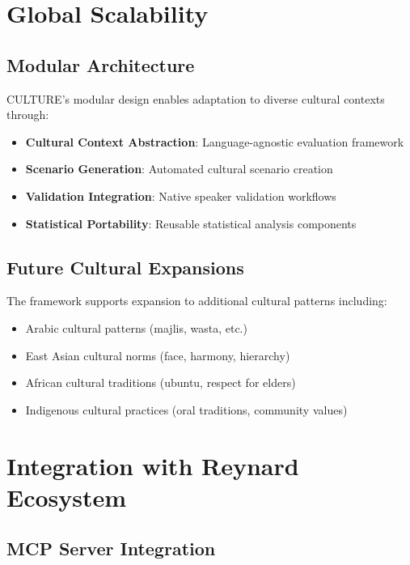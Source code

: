 \documentclass[11pt,twocolumn]{article}
\begin{document}
\section{Global Scalability}

\subsection{Modular Architecture}

CULTURE's modular design enables adaptation to diverse cultural contexts through:

\begin{itemize}
    \item \textbf{Cultural Context Abstraction}: Language-agnostic evaluation framework
    \item \textbf{Scenario Generation}: Automated cultural scenario creation
    \item \textbf{Validation Integration}: Native speaker validation workflows
    \item \textbf{Statistical Portability}: Reusable statistical analysis components
\end{itemize}

\subsection{Future Cultural Expansions}

The framework supports expansion to additional cultural patterns including:

\begin{itemize}
    \item Arabic cultural patterns (majlis, wasta, etc.)
    \item East Asian cultural norms (face, harmony, hierarchy)
    \item African cultural traditions (ubuntu, respect for elders)
    \item Indigenous cultural practices (oral traditions, community values)
\end{itemize}

\section{Integration with Reynard Ecosystem}

\subsection{MCP Server Integration}
\end{document}
